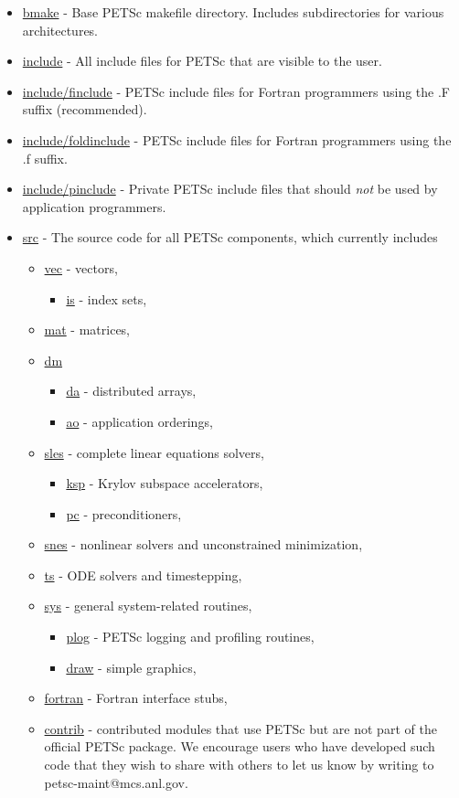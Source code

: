 \begin{itemize}
\item \url{bmake} - Base PETSc makefile directory.  Includes subdirectories
                    for various architectures.
\item \url{include} - All include files for PETSc that are visible to the user.
\item \url{include/finclude}    - PETSc include files for Fortran programmers using 
                                  the .F suffix (recommended).
\item \url{include/foldinclude} - PETSc include files for Fortran programmers using 
                                  the .f suffix.
\item \url{include/pinclude}    - Private PETSc include files that should {\em not} 
                                  be used by application programmers.
\item \url{src} - The source code for all PETSc components, which
                  currently includes
 \begin{itemize}
 \item \url{vec} - vectors,
   \begin{itemize}
     \item \url{is} - index sets,
   \end{itemize}
 \item \url{mat} - matrices,
 \item \url{dm}
   \begin{itemize}
    \item \url{da} - distributed arrays,
    \item \url{ao} - application orderings,
   \end{itemize}
 \item \url{sles} - complete linear equations solvers,
 \begin{itemize}
   \item \url{ksp} - Krylov subspace accelerators,
   \item \url{pc} - preconditioners,
 \end{itemize}
 \item \url{snes} - nonlinear solvers and unconstrained minimization,
 \item \url{ts} - ODE solvers and timestepping,
 \item \url{sys} - general system-related routines,
 \begin{itemize}
   \item \url{plog} - PETSc logging and profiling routines,
   \item \url{draw} - simple graphics,
 \end{itemize}
 \item \url{fortran} - Fortran interface stubs,
 \item \url{contrib} - contributed modules that use PETSc but are not
    part of the official PETSc package.  We encourage users who have
    developed such code that they wish to share with others to let us
    know by writing to petsc-maint@mcs.anl.gov.
 \end{itemize}
\end{itemize}

